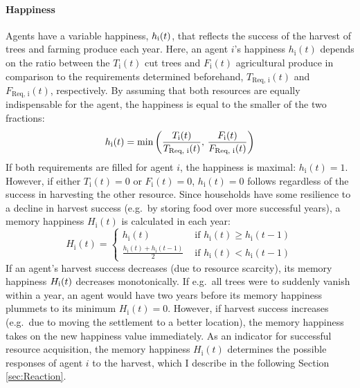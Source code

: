 \paragraph{Happiness}
Agents have a variable happiness, $h_{\rm i}(t)$, that reflects the success of the harvest of trees and farming produce each year.
Here, an agent $i$'s happiness $h_\text{i}(t)$ depends on the ratio between the $T_\text{i}(t)$ cut trees and $F_\text{i}(t)$ agricultural produce in comparison to the requirements determined beforehand, $T_\text{Req, i}(t)$ and $F_\text{Req, i}(t)$, respectively.
By assuming that both resources are equally indispensable for the agent, the happiness is equal to the smaller of the two fractions:
\begin{equation} 
h_\text{i}(t) = {\rm min} \left( \frac{T_\text{i}(t)}{T_\text{Req, i}(t)}, \, \frac{F_\text{i}(t)}{F_\text{Req, i}(t)} \right)
\label{eq:h_i}
\end{equation}
If both requirements are filled for agent $i$, the happiness is maximal: $h_\text{i}(t)=1$.
However, if either $T_\text{i}(t)=0$ or $F_\text{i}(t)=0$, $h_\text{i}(t)=0$ follows regardless of the success in harvesting the other resource.
Since households have some resilience to a decline in harvest success (e.g.\ by storing food over more successful years), a memory happiness $H_\text{i}(t)$ is calculated in each year:
\begin{equation}
H_\text{i}(t) = \begin{cases} 
				h_\text{i}(t) & \text{ if } h_\text{i}(t)\geq h_\text{i}(t-1) \\
				\frac{h_\text{i}(t) + h_\text{i}(t-1)}{2} & \text{ if } h_\text{i}(t)<h_\text{i}(t-1) 
		\end{cases}
\end{equation}
If an agent's harvest success decreases (due to resource scarcity), its memory happiness $H_{\rm i}(t)$ decreases monotonically.
If e.g.\ all trees were to suddenly vanish within a year, an agent would have two years before its memory happiness plummets to its minimum $H_\text{i}(t) = 0$.
However, if harvest success increases (e.g.\ due to moving the settlement to a better location), the memory happiness takes on the new happiness value immediately.
As an indicator for successful resource acquisition, the memory happiness $H_\text{i}(t)$ determines the possible responses of agent $i$ to the harvest, which I describe in the following Section \ref{sec:Reaction}.

